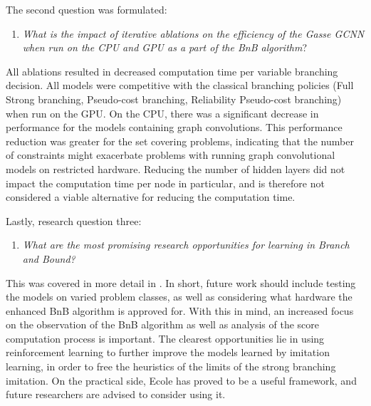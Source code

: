 The second question was formulated:
%
\begin{enumerate}[resume*]
    \item \textit{What is the impact of iterative ablations on the efficiency of the Gasse \gls{GCNN} when run on the \gls{CPU} and \gls{GPU} as a part of the \gls{BnB} algorithm}?
\end{enumerate}
%
All ablations resulted in decreased computation time per variable branching decision. All models were competitive with the classical branching policies (Full Strong branching, Pseudo-cost branching, Reliability Pseudo-cost branching) when run on the \gls{GPU}. On the \gls{CPU}, there was a significant decrease in performance for the models containing graph convolutions. This performance reduction was greater for the set covering problems, indicating that the number of constraints might exacerbate problems with running graph convolutional models on restricted hardware. Reducing the number of hidden layers did not impact the computation time per node in particular, and is therefore not considered a viable alternative for reducing the computation time.    

Lastly, research question three:
%
\begin{enumerate}[resume*]
    \item \textit{What are the most promising research opportunities for learning in Branch and Bound?}
\end{enumerate}
%
This was covered in more detail in . In short, future work should include testing the models on varied problem classes, as well as considering what hardware the enhanced \gls{BnB} algorithm is approved for. With this in mind, an increased focus on the observation of the \gls{BnB} algorithm as well as analysis of the score computation process is important. The clearest opportunities lie in using reinforcement learning to further improve the models learned by imitation learning, in order to free the heuristics of the limits of the strong branching imitation. On the practical side, \gls{Ecole} has proved to be a useful framework, and future researchers are advised to consider using it.  
